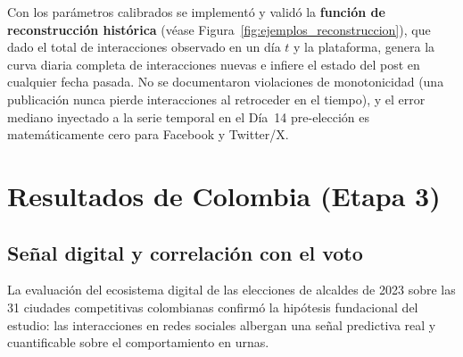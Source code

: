 Con los parámetros calibrados se implementó y validó la \textbf{función de reconstrucción histórica} (véase Figura~\ref{fig:ejemplos_reconstruccion}), que dado el total de interacciones observado en un día $t$ y la plataforma, genera la curva diaria completa de interacciones nuevas e infiere el estado del post en cualquier fecha pasada. No se documentaron violaciones de monotonicidad (una publicación nunca pierde interacciones al retroceder en el tiempo), y el error mediano inyectado a la serie temporal en el Día~14 pre-elección es matemáticamente cero para Facebook y Twitter/X.



\section{Resultados de Colombia (Etapa 3)}

\subsection{Señal digital y correlación con el voto}

La evaluación del ecosistema digital de las elecciones de alcaldes de 2023 sobre las 31 ciudades competitivas colombianas confirmó la hipótesis fundacional del estudio: las interacciones en redes sociales albergan una señal predictiva real y cuantificable sobre el comportamiento en urnas.

